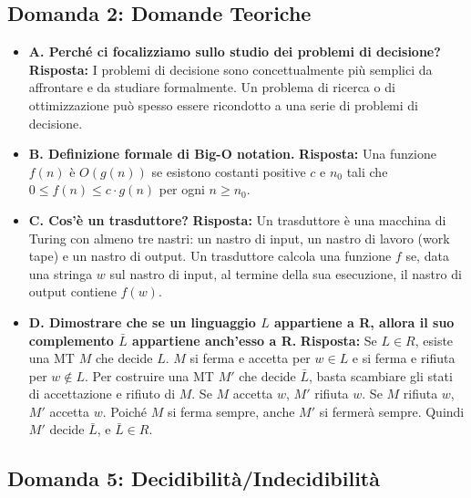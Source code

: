 \documentclass[a4paper, 11pt]{book} %
\theoremstyle{definition}
\begin{document}
\subsection{Domanda 2: Domande Teoriche}
\begin{itemize}
    \item \textbf{A. Perché ci focalizziamo sullo studio dei problemi di decisione?}
    \textbf{Risposta:} I problemi di decisione sono concettualmente più semplici da affrontare e da studiare formalmente. Un problema di ricerca o di ottimizzazione può spesso essere ricondotto a una serie di problemi di decisione.

    \item \textbf{B. Definizione formale di Big-O notation.}
    \textbf{Risposta:} Una funzione $f(n)$ è $O(g(n))$ se esistono costanti positive $c$ e $n_0$ tali che $0 \le f(n) \le c \cdot g(n)$ per ogni $n \ge n_0$.

    \item \textbf{C. Cos'è un trasduttore?}
    \textbf{Risposta:} Un trasduttore è una macchina di Turing con almeno tre nastri: un nastro di input, un nastro di lavoro (work tape) e un nastro di output. Un trasduttore calcola una funzione $f$ se, data una stringa $w$ sul nastro di input, al termine della sua esecuzione, il nastro di output contiene $f(w)$.

    \item \textbf{D. Dimostrare che se un linguaggio $L$ appartiene a R, allora il suo complemento $\bar{L}$ appartiene anch'esso a R.}
    \textbf{Risposta:} Se $L \in R$, esiste una MT $M$ che decide $L$. $M$ si ferma e accetta per $w \in L$ e si ferma e rifiuta per $w \notin L$. Per costruire una MT $M'$ che decide $\bar{L}$, basta scambiare gli stati di accettazione e rifiuto di $M$. Se $M$ accetta $w$, $M'$ rifiuta $w$. Se $M$ rifiuta $w$, $M'$ accetta $w$. Poiché $M$ si ferma sempre, anche $M'$ si fermerà sempre. Quindi $M'$ decide $\bar{L}$, e $\bar{L} \in R$.
\end{itemize}

\subsection{Domanda 5: Decidibilità/Indecidibilità}
\end{document}
